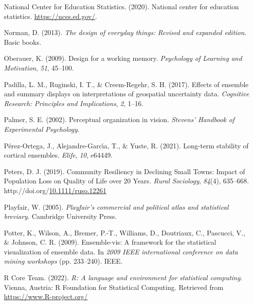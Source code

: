 \documentclass[print]{nuthesis}
\newlength{\cslhangindent}
\newenvironment{CSLReferences}[2]%
{\setlength{\parindent}{0pt}%
\everypar{\setlength{\hangindent}{\cslhangindent}}\ignorespaces}%
{\par}
\begin{document}
\begin{CSLReferences}{1}{0}
\leavevmode{}%
National Center for Education Statistics. (2020). National center for education statistics. \url{https://nces.ed.gov/}.

\leavevmode{}%
Norman, D. (2013). \emph{The design of everyday things: Revised and expanded edition}. Basic books.

\leavevmode{}%
Oberauer, K. (2009). Design for a working memory. \emph{Psychology of Learning and Motivation}, \emph{51}, 45--100.

\leavevmode{}%
Padilla, L. M., Ruginski, I. T., \& Creem-Regehr, S. H. (2017). Effects of ensemble and summary displays on interpretations of geospatial uncertainty data. \emph{Cognitive Research: Principles and Implications}, \emph{2}, 1--16.

\leavevmode{}%
Palmer, S. E. (2002). Perceptual organization in vision. \emph{Stevens' Handbook of Experimental Psychology}.

\leavevmode{}%
Pérez-Ortega, J., Alejandre-Garcı́a, T., \& Yuste, R. (2021). Long-term stability of cortical ensembles. \emph{Elife}, \emph{10}, e64449.

\leavevmode{}%
Peters, D. J. (2019). Community {Resiliency} in {Declining} {Small} {Towns}: {Impact} of {Population} {Loss} on {Quality} of {Life} over 20 {Years}. \emph{Rural Sociology}, \emph{84}(4), 635--668. http://doi.org/\href{https://doi.org/10.1111/ruso.12261}{10.1111/ruso.12261}

\leavevmode{}%
Playfair, W. (2005). \emph{Playfair's commercial and political atlas and statistical breviary}. Cambridge University Press.

\leavevmode{}%
Potter, K., Wilson, A., Bremer, P.-T., Williams, D., Doutriaux, C., Pascucci, V., \& Johnson, C. R. (2009). Ensemble-vis: A framework for the statistical visualization of ensemble data. In \emph{2009 IEEE international conference on data mining workshops} (pp. 233--240). IEEE.

\leavevmode{}%
R Core Team. (2022). \emph{R: A language and environment for statistical computing}. Vienna, Austria: R Foundation for Statistical Computing. Retrieved from \url{https://www.R-project.org/}


\end{CSLReferences}
\end{document}
